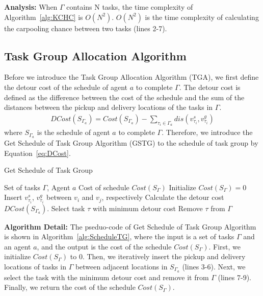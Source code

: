 \documentclass[sigconf,anonymous]{aamas}
\begin{document}
\textbf{Analysis:}
When $\Gamma$ contains N tasks,
the time complexity of Algorithm~\ref{alg:KCHC} is $O(N^2)$.
$O(N^2)$ is the time complexity of calculating the carpooling chance between two tasks (lines 2-7).

\subsection{Task Group Allocation Algorithm}


Before we introduce the Task Group Allocation Algorithm (TGA),
we first define the detour cost of the schedule of agent $a$ to complete $\Gamma$.
The detour cost is defined as the difference between the cost of the schedule 
and the sum of the distances between the pickup and delivery locations of the tasks in $\Gamma$.
\begin{eqnarray}
  \label{eq:DCost}
  DCost(S_{\Gamma_{a}}) = Cost(S_{\Gamma_{a}}) - \sum_{\tau_i \in \Gamma_a}{dis(v^{s}_{\tau_i}, v^{g}_{\tau_i})}
\end{eqnarray}
where $S_{\Gamma_{a}}$ is the schedule of agent $a$ to complete $\Gamma$.
Therefore, we introduce the Get Schedule of Task Group Algorithm (GSTG) 
to the schedule of task group by Equation~\ref{eq:DCost}.

\begin{algorithm}[htbp]
\caption{Get Schedule of Task Group}
\label{alg:ScheduleTG}
\begin{algorithmic}[1]
\Require Set of tasks $\Gamma$, Agent $a$ %
\Ensure Cost of schedule $Cost({S_{\Gamma}})$ %
\State Initialize $Cost({S_{\Gamma}}) = 0$
      \State Insert $v^s_{\tau_i}$, $v^g_{\tau_i}$ between $v_{i}$ and $v_{j}$, respectively
      \State Calculate the detour cost $DCost(S_{\Gamma_{a}})$.
  \EndFor
  \State Select task $\tau$ with minimum detour cost
  \State Remove $\tau$ from $\Gamma$
\EndWhile
\end{algorithmic}
\end{algorithm}

\textbf{Algorithm Detail:}
The pseduo-code of Get Schedule of Task Group Algorithm is shown in Algorithm~\ref{alg:ScheduleTG},
where the input is a set of tasks $\Gamma$ and an agent $a$,
and the output is the cost of the schedule $Cost({S_{\Gamma}})$.
First, we initialize $Cost({S_{\Gamma}})$ to 0.
Then, we iteratively insert the pickup and delivery locations of tasks in $\Gamma$
between adjacent locations in $S_{\Gamma_a}$ (lines 3-6).
Next, we select the task with the minimum detour cost and remove it from $\Gamma$ (lines 7-9).
Finally, we return the cost of the schedule $Cost({S_{\Gamma}})$.
\end{document}

